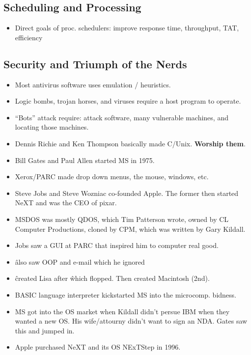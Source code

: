 \documentclass[fontsize=4.5pt]{scrartcl}
\begin{document}
\begin{multicols}{3}
    \subsection{Scheduling and Processing}
      \begin{itemize}
        \item Direct goals of proc. schedulers: improve response time, throughput, TAT, efficiency
      \end{itemize}

    
    
    \subsection{Security and Triumph of the Nerds}
      \begin{itemize}
        \item Most antivirus software uses emulation / heuristics.
        \item Logic bombs, trojan horses, and viruses require a host program to operate.
        \item ``Bots'' attack require: attack software, many vulnerable machines, and locating those machines.
        \item Dennis Richie and Ken Thompson basically made C/Unix. \textbf{Worship them}.
        \item Bill Gates and Paul Allen started MS in 1975.
        \item Xerox/PARC made drop down menus, the mouse, windows, etc.
        \item Steve Jobs and Steve Wozniac co-founded Apple. The former then started NeXT and was the CEO of pixar.
        \item MSDOS was mostly QDOS, which Tim Patterson wrote, owned by CL Computer Productions, cloned by CPM, which was written by Gary Kildall.
        \item Jobs saw a GUI at PARC that inspired him to computer real good.
        \item \^ also saw OOP and e-mail which he ignored
        \item \^ created Lisa after \^ which flopped. Then created Macintosh (2nd).
        \item BASIC language interpreter kickstarted MS into the microcomp. bidness.
        \item MS got into the OS market when Kildall didn't persue IBM when they wanted a new OS. His wife/attourny didn't want to sign an NDA. Gates saw this and jumped in.
        \item Apple purchased NeXT and its OS NExTStep in 1996.

\end{itemize}
\end{multicols}
\end{document}
